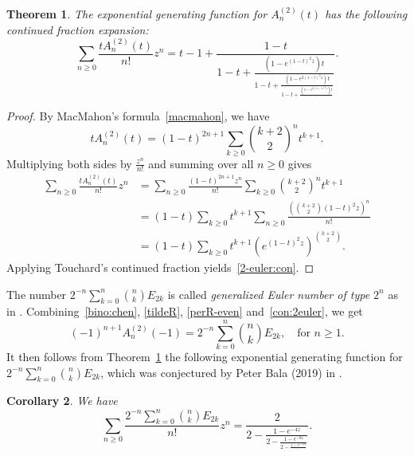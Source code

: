 \documentclass[11pt,reqno]{amsart}
\numberwithin{equation}{section}
\theoremstyle{plain}
\newtheorem{theorem}{Theorem}[section]
\newtheorem{corollary}[theorem]{Corollary}
\theoremstyle{definition}
\begin{document}
\begin{theorem}\label{thm:2-euler:con}
The exponential generating function for $A_n^{(2)}(t)$ has the following continued fraction expansion:
\begin{equation}\label{2-euler:con}
\sum_{n\geq0}\frac{tA_n^{(2)}(t)}{n!}z^n=t-1+\frac{1-t}{1-t+\displaystyle\frac{(1-e^{(1-t)^2z})t}{1-t+\displaystyle\frac{(1-e^{2(1-t)^2z})t}{1-t+\displaystyle\frac{(1-e^{3(1-t)^2z})t}{\cdots}}}}.
\end{equation}
\end{theorem}
\begin{proof}
By MacMahon's formula~\eqref{macmahon}, we have
$$
tA_n^{(2)}(t)=(1-t)^{2n+1}\sum_{k\geq 0}\binom{k+2}{2}^n t^{k+1}.
$$
Multiplying both sides by $\frac{z^n}{n!}$ and summing over all $n\geq0$ gives
\begin{align*}
\sum_{n\geq0}\frac{tA_n^{(2)}(t)}{n!}z^n&=\sum_{n\geq0}\frac{(1-t)^{2n+1}z^n}{n!}\sum_{k\geq 0}\binom{k+2}{2}^n t^{k+1}\\
&=(1-t)\sum_{k\geq0}t^{k+1}\sum_{n\geq0}\frac{(\binom{k+2}{2}(1-t)^2z)^n}{n!}\\
&=(1-t)\sum_{k\geq0}t^{k+1}(e^{(1-t)^2z})^{\binom{k+2}{2}}.
\end{align*}
Applying Touchard's continued fraction yields~\eqref{2-euler:con}.
\end{proof}

The number $2^{-n}\sum_{k=0}^n\binom{n}{k}E_{2k}$ is called {\em generalized Euler number of type $2^n$} as in \cite[A005799]{oeis}. Combining~\eqref{bino:chen}, \eqref{tildeR}, \eqref{perR-even} and~\eqref{con:2euler}, we get
\begin{equation}\label{sign:euler2}
(-1)^{n+1}A_n^{(2)}(-1)=2^{-n}\sum_{k=0}^n\binom{n}{k}E_{2k},\quad\text{for $n\geq1$}.
\end{equation}
It then follows from Theorem~\ref{thm:2-euler:con} the following exponential generating function for $2^{-n}\sum_{k=0}^n\binom{n}{k}E_{2k}$, which was conjectured by Peter Bala (2019) in \cite[A005799]{oeis}.

\begin{corollary} We have
\begin{equation*}
\sum_{n\geq0}\frac{2^{-n}\sum_{k=0}^n\binom{n}{k}E_{2k}}{n!}z^n=\frac{2}{2-\displaystyle\frac{1-e^{-4z}}{2-\displaystyle\frac{1-e^{-8z}}{2-\displaystyle\frac{1-e^{-12z}}{\cdots}}}}.
\end{equation*}
\end{corollary}
\end{document}
